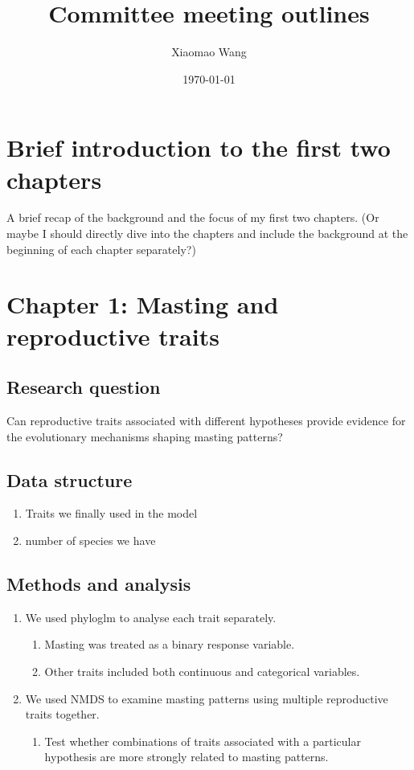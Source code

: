 \documentclass[11pt,letter]{article}
\begin{document}
\title{Committee meeting outlines}
\author{Xiaomao Wang} 
\date{\today}
\maketitle

\setlength{\parindent}{0pt}
\setlength{\parskip}{3pt}

\section{Brief introduction to the first two chapters}
A brief recap of the background and the focus of my first two chapters. (Or maybe I should directly dive into the chapters and include the background at the beginning of each chapter separately?)
\section{Chapter 1: Masting and reproductive traits}
\subsection{Research question}
Can reproductive traits associated with different hypotheses provide evidence for the evolutionary mechanisms shaping masting patterns?
\subsection{Data structure}
\begin{enumerate}
\item Traits we finally used in the model
\item number of species we have
\end{enumerate}
\subsection{Methods and analysis}
\begin{enumerate}
\item We used phyloglm to analyse each trait separately.
\begin{enumerate}
    \item Masting was treated as a binary response variable.
    \item Other traits included both continuous and categorical variables.
\end{enumerate}
\item We used NMDS to examine masting patterns using multiple reproductive traits together.
\begin{enumerate}
    \item Test whether combinations of traits associated with a particular hypothesis are more strongly related to masting patterns.
\end{enumerate}
\end{enumerate}
\end{document}
